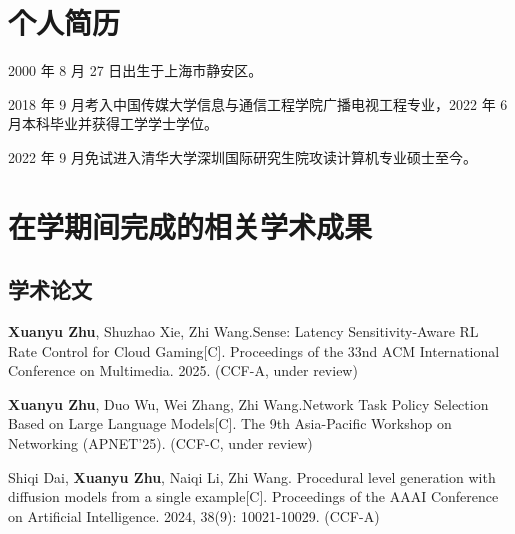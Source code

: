
\begin{resume}

  \section*{个人简历}

  2000 年 8 月 27 日出生于上海市静安区。

  2018 年 9 月考入中国传媒大学信息与通信工程学院广播电视工程专业，2022 年 6 月本科毕业并获得工学学士学位。

  2022 年 9 月免试进入清华大学深圳国际研究生院攻读计算机专业硕士至今。


  \section*{在学期间完成的相关学术成果}

  \subsection*{学术论文}

  \begin{achievements}
    \item \textbf{Xuanyu Zhu}, Shuzhao Xie, Zhi Wang.Sense: Latency Sensitivity-Aware RL Rate Control for Cloud Gaming[C]. Proceedings of the 33nd ACM International Conference on Multimedia. 2025. (CCF-A, under review)
    
    \item \textbf{Xuanyu Zhu}, Duo Wu, Wei Zhang, Zhi Wang.Network Task Policy Selection Based on Large Language Models[C]. The 9th Asia-Pacific Workshop on Networking (APNET'25). (CCF-C, under review)
    
    \item Shiqi Dai, \textbf{Xuanyu Zhu}, Naiqi Li, Zhi Wang. Procedural level generation with diffusion models from a single example[C]. Proceedings of the AAAI Conference on Artificial Intelligence. 2024, 38(9): 10021-10029. (CCF-A)

  \end{achievements}
\end{resume}
